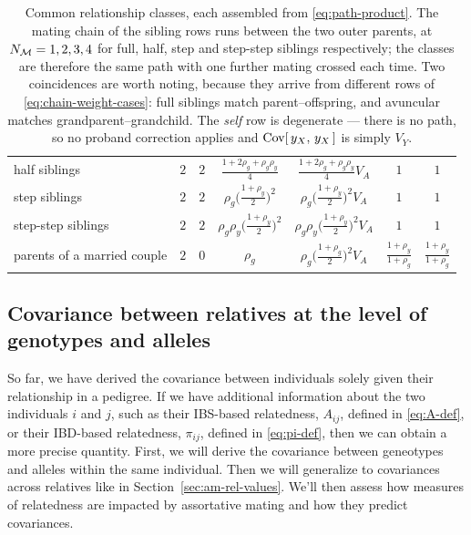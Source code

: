 \documentclass[12pt]{article}
\begin{document}
\begin{table}[H]
\begin{floatcard}
\begin{tabular}{l|cc|c|c|cc}
        half siblings
            & $2$ & $2$ & $\tfrac{1 + 2\rho_g + \rho_g\rho_y}{4}$
            & $\tfrac{1 + 2\rho_g + \rho_g\rho_y}{4} V_A$
            & $1$ & $1$ \\
        step siblings
            & $2$ & $2$ & $\rho_g\big(\tfrac{1+\rho_y}{2}\big)^{2}$
            & $\rho_g\big(\tfrac{1+\rho_y}{2}\big)^{2} V_A$
            & $1$ & $1$ \\
        step-step siblings
            & $2$ & $2$ & $\rho_g\rho_y\big(\tfrac{1+\rho_y}{2}\big)^{2}$
            & $\rho_g\rho_y\big(\tfrac{1+\rho_y}{2}\big)^{2} V_A$
            & $1$ & $1$ \\
        parents of a married couple
            & $2$ & $0$ & $\rho_g$
            & $\rho_g\big(\tfrac{1+\rho_g}{2}\big)^{2} V_A$
            & $\tfrac{1+\rho_y}{1+\rho_g}$ & $\tfrac{1+\rho_y}{1+\rho_g}$ \\
    \end{tabular}
    \caption{%
        Common relationship classes, each assembled from \eqref{eq:path-product}.
        The mating chain of the sibling rows runs between the two outer parents, at $N_{\mathcal{M}} = 1, 2, 3, 4$ for full, half, step and step-step siblings respectively; the classes are therefore the same path with one further mating crossed each time.
        Two coincidences are worth noting, because they arrive from different rows of \eqref{eq:chain-weight-cases}: full siblings match parent--offspring, and avuncular matches grandparent--grandchild.
        The \emph{self} row is degenerate --- there is no path, so no proband correction applies and $\mathrm{Cov}[\,y_X,\, y_X\,]$ is simply $V_Y$.%
    }
    \label{tab:relationship-classes}
    \end{floatcard}
\end{table}

\subsection{Covariance between relatives at the level of genotypes and alleles}\label{sec:am-rel-geno}
So far, we have derived the covariance between individuals solely given their relationship in a pedigree.
If we have additional information about the two individuals $i$ and $j$, such as their IBS-based relatedness, $A_{ij}$, defined in \eqref{eq:A-def}, or their IBD-based relatedness, $\pi_{ij}$, defined in \eqref{eq:pi-def}, then we can obtain a more precise quantity.
First, we will derive the covariance between geneotypes and alleles within the same individual.
Then we will generalize to covariances across relatives like in Section~\ref{sec:am-rel-values}.
We'll then assess how measures of relatedness are impacted by assortative mating and how they predict covariances.
\end{document}
